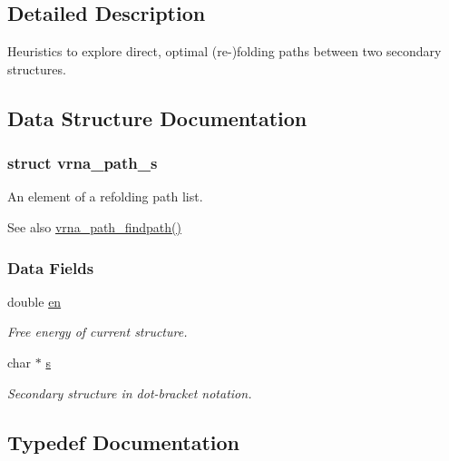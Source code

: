 \subsection{Detailed Description}
Heuristics to explore direct, optimal (re-\/)folding paths between two secondary structures. 



\subsection{Data Structure Documentation}
\label{structvrna__path__s}
\subsubsection{struct vrna\+\_\+path\+\_\+s}
An element of a refolding path list. 

\begin{DoxySeeAlso}{See also}
\hyperlink{group__direct__paths_ga5e1f97f58adc65016a8df88802dc16b5}{vrna\+\_\+path\+\_\+findpath()} 
\end{DoxySeeAlso}
\subsubsection*{Data Fields}
\begin{DoxyCompactItemize}
\item 
\mbox{\label{group__direct__paths_ac25160bf31d28097358278f367e41227}} 
double \hyperlink{group__direct__paths_ac25160bf31d28097358278f367e41227}{en}
\begin{DoxyCompactList}\small\item\em Free energy of current structure. \end{DoxyCompactList}\item 
\mbox{\label{group__direct__paths_a141b70a59cb81d10bc65bbb7a0f6db77}} 
char $\ast$ \hyperlink{group__direct__paths_a141b70a59cb81d10bc65bbb7a0f6db77}{s}
\begin{DoxyCompactList}\small\item\em Secondary structure in dot-\/bracket notation. \end{DoxyCompactList}\end{DoxyCompactItemize}


\subsection{Typedef Documentation}
\mbox{\label{group__direct__paths_gab6b8737d5377e70a7815d04aae7fd884}} 
